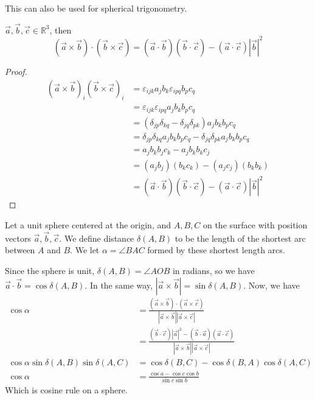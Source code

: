 \documentclass[12pt]{article}
\begin{document}
This can also be used for spherical trigonometry.

\begin{prop}
    $\vec{a},\vec{b},\vec{c} \in \mathbb{R}^{3}$, then
    \[
        (\vec{a}\times\vec{b})\cdot(\vec{b}\times\vec{c})
        = (\vec{a}\cdot\vec{b})(\vec{b}\cdot\vec{c})
        - (\vec{a}\cdot\vec{c})|\vec{b}|^{2}
    \]
\end{prop}
\begin{proof}
    \begin{align*}
        (\vec{a}\times\vec{b})_i (\vec{b}\times\vec{c})_i
        &= \varepsilon_{ijk}a_jb_k \varepsilon_{ipq}b_pc_q\\
        &= \varepsilon_{ijk}\varepsilon_{ipq} a_jb_k b_pc_q\\
        &= (\delta_{jp}\delta_{kq} - \delta_{jq}\delta_{pk}) a_jb_k b_pc_q\\
        &= \delta_{jp}\delta_{kq}a_jb_k b_pc_q - \delta_{jq}\delta_{pk} a_jb_k b_pc_q\\
        &= a_jb_kb_jc_k - a_jb_kb_kc_j\\
        &= (a_jb_j)(b_kc_k) - (a_jc_j)(b_kb_k)\\
        &= (\vec{a}\cdot\vec{b})(\vec{b}\cdot\vec{c}) - (\vec{a}\cdot\vec{c})|\vec{b}|^{2}
    \end{align*}
\end{proof}

Let a unit sphere centered at the origin,
and $A,B,C$ on the surface with position vectors $\vec{a},\vec{b},\vec{c}$.
We define distance $\delta(A,B)$ to be the length of the
shortest arc between $A$ and $B$.
We let $\alpha = \angle BAC$ formed by these
shortest length arcs.

Since the sphere is unit, $\delta(A,B) = \angle AOB$ in radians,
so we have $\vec{a}\cdot\vec{b} = \cos\delta(A,B)$.
In the same way, $|\vec{a}\times\vec{b}| = \sin\delta(A,B)$.
Now, we have
\begin{align*}
    \cos\alpha 
    &= \frac{(\vec{a}\times\vec{b})\cdot(\vec{a}\times\vec{c})}{|\vec{a}\times\vec{b}||\vec{a}\times\vec{c}|}\\
    &= \frac{(\vec{b}\cdot\vec{c})|\vec{a}|^{2} - (\vec{b}\cdot\vec{a})(\vec{a}\cdot\vec{c})}
    {|\vec{a}\times\vec{b}||\vec{a}\times\vec{c}|}\\
    \cos\alpha \sin\delta(A,B) \sin\delta(A,C)
    &= \cos\delta(B,C) - \cos\delta(B,A)\cos\delta(A,C)\\
    \cos\alpha
    &= \frac{\cos a - \cos c \cos b}{\sin c \sin b}
\end{align*}
Which is cosine rule on a sphere.
\end{document}
